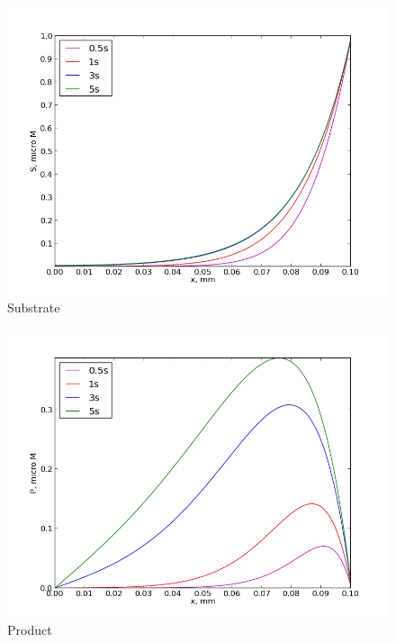 \documentclass[12pt, a4paper, lithuanian]{article}
\begin{document}
\begin{figure}[H]
    \centering
    \includegraphics[scale=0.5]{img/S}
    \caption{Substrate}
    \label{img:mlp}
\end{figure}

\begin{figure}[H]
    \centering
    \includegraphics[scale=0.5]{img/P}
    \caption{Product}
    \label{img:mlp}
\end{figure}
\end{document}
